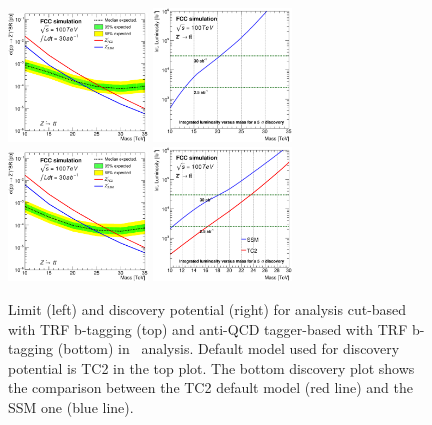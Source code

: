\begin{figure}[!htb]\centering
\includegraphics[width=0.33\textwidth]{Fig/Zptt/lim_Zprime_tt_fcc_v02_cut_TRFbtag.eps}
\includegraphics[width=0.33\textwidth]{Fig/Zptt/DiscoveryPotential_tt_cut_TRFbtag_rootStyle.eps}
\includegraphics[width=0.33\textwidth]{Fig/Zptt/lim_Zprime_tt_fcc_v02_tagger_TRFbtag.eps}
\includegraphics[width=0.33\textwidth]{Fig/Zptt/DiscoveryPotential_tt_SSM_TC2_tagger_TRFbtag_rootStyle.eps}
\caption{Limit (left) and discovery potential (right) for analysis cut-based with TRF b-tagging (top) and anti-QCD tagger-based with TRF b-tagging (bottom) in \zptt\ analysis. Default model used for discovery potential is TC2 in the top plot. The bottom discovery plot shows the comparison between the TC2 default model (red line) and the SSM one (blue line).}
\label{fig:Zptt_limit_trf}
\end{figure}


